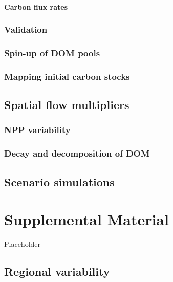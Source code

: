 \documentclass[
]{book}
\begin{document}
\hypertarget{carbon-flux-rates}{%
\subsubsection{Carbon flux rates}\label{carbon-flux-rates}}

\hypertarget{validation}{%
\subsection{Validation}\label{validation}}

\hypertarget{spin-up-of-dom-pools}{%
\subsection{Spin-up of DOM pools}\label{spin-up-of-dom-pools}}

\hypertarget{mapping-initial-carbon-stocks}{%
\subsection{Mapping initial carbon stocks}\label{mapping-initial-carbon-stocks}}

\hypertarget{spatial-flow-multipliers}{%
\section{Spatial flow multipliers}\label{spatial-flow-multipliers}}

\hypertarget{npp-variability}{%
\subsection{NPP variability}\label{npp-variability}}

\hypertarget{decay-and-decomposition-of-dom}{%
\subsection{Decay and decomposition of DOM}\label{decay-and-decomposition-of-dom}}

\hypertarget{scenario-simulations}{%
\section{Scenario simulations}\label{scenario-simulations}}

\hypertarget{supplemental-material}{%
\chapter{Supplemental Material}\label{supplemental-material}}

Placeholder

\hypertarget{regional-variability}{%
\section{Regional variability}\label{regional-variability}}

  
\end{document}
